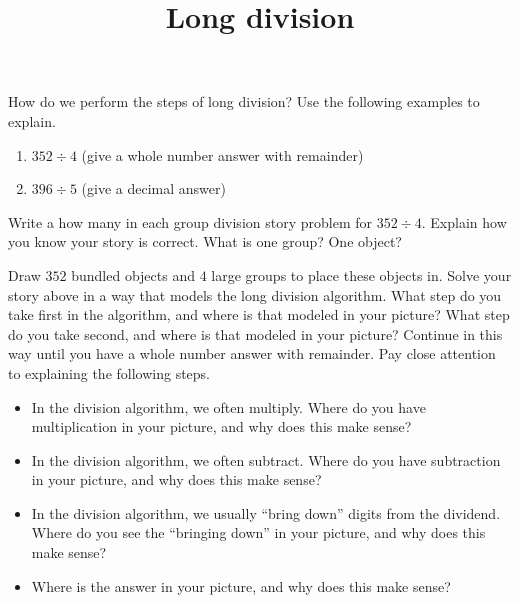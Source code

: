 \documentclass[nooutcomes,noauthor]{ximera}
\title{Long division}
\begin{document}
\begin{abstract}
\end{abstract}

\maketitle

\begin{problem}
How do we perform the steps of long division? Use the following examples to explain.
\begin{enumerate}
\item $352 \div 4$ (give a whole number answer with remainder)
\item $396 \div 5$ (give a decimal answer)
\end{enumerate}
\end{problem}


\begin{problem}
Write a how many in each group division story problem for $352 \div 4$. Explain how you know your story is correct. What is one group? One object?
\end{problem}


\begin{problem}
Draw $352$ bundled objects and $4$ large groups to place these objects in. Solve your story above in a way that models the long division algorithm. What step do you take first in the algorithm, and where is that modeled in your picture? What step do you take second, and where is that modeled in your picture? Continue in this way until you have a whole number answer with remainder. Pay close attention to explaining the following steps.
\begin{itemize}
	\item In the division algorithm, we often multiply. Where do you have multiplication in your picture, and why does this make sense?
	\item In the division algorithm, we often subtract. Where do you have subtraction in your picture, and why does this make sense?
	\item In the division algorithm, we usually ``bring down'' digits from the dividend. Where do you see the ``bringing down'' in your picture, and why does this make sense?
	\item Where is the answer in your picture, and why does this make sense?
\end{itemize}

\end{problem}
\end{document}
